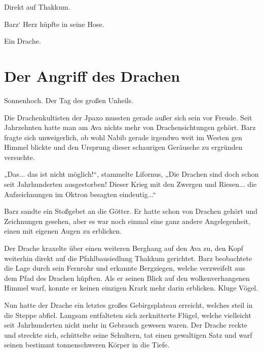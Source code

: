 Direkt auf Thakkum.

Barz‘ Herz hüpfte in seine Hose.

Ein Drache.






















\newpage
\section{Der Angriff des Drachen}


Sonnenhoch. Der Tag des großen Unheils.\bigskip



Die Drachenkultisten der Jpaxo mussten gerade außer sich sein vor Freude. Seit Jahrzehnten hatte man am Ava nichts mehr von Drachensichtungen gehört. Barz fragte sich unweigerlich, ob wohl Nabib gerade irgendwo weit im Westen gen Himmel blickte und den Ursprung dieser schaurigen Geräusche zu ergründen versuchte.

„Das... das ist nicht möglich!“, stammelte Lifornus, „Die Drachen sind doch schon seit Jahrhunderten ausgestorben! Dieser Krieg mit den Zwergen und Riesen... die Aufzeichnungen im Oktron besagten eindeutig...“

Barz sandte ein Stoßgebet an die Götter. Er hatte schon von Drachen gehört und Zeichnungen gesehen, aber es war noch einmal eine ganz andere Angelegenheit, einen mit eigenen Augen zu erblicken.

Der Drache kraxelte über einen weiteren Berghang auf den Ava zu, den Kopf weiterhin direkt auf die Pfahlbausiedlung Thakkum gerichtet. Barz beobachtete die Lage durch sein Fernrohr und erkannte Bergziegen, welche verzweifelt aus dem Pfad des Drachen hüpften. Als er seinen Blick auf den wolkenverhangenen Himmel warf, konnte er keinen einzigen Krark mehr darin erblicken. Kluge Vögel.

Nun hatte der Drache ein letztes großes Gebirgsplateau erreicht, welches steil in die Steppe abfiel. Langsam entfalteten sich zerknitterte Flügel, welche vielleicht seit Jahrhunderten nicht mehr in Gebrauch gewesen waren. Der Drache reckte und streckte sich, schüttelte seine Schultern, tat einen gewaltigen Satz und warf seinen bestimmt tonnenschweren Körper in die Tiefe.

